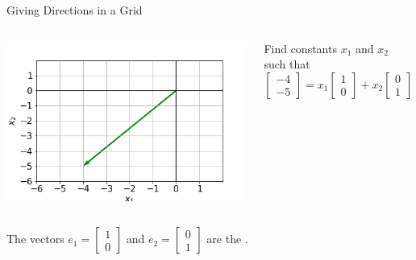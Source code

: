 \documentclass[xcoler=dvipsnames, aspectratio=169]{beamer}
\begin{document}
    \begin{frame}{Giving Directions in a Grid}
        \begin{columns}
            \includegraphics[width=.6\textwidth]{images/fig-span1.png}
            \begin{example}
                Find constants $x_1$ and $x_2$ such that
                \[
                    \begin{bmatrix}
                        -4\\-5
                    \end{bmatrix} = x_1\begin{bmatrix}
                        1\\0
                    \end{bmatrix} + x_2\begin{bmatrix}
                        0\\1
                    \end{bmatrix}
                \]
            \end{example}
        \end{columns}
        \pause
        \begin{tcolorbox}
            The vectors $e_1 = \begin{bmatrix}
                1\\0
            \end{bmatrix}$ and $e_2 = \begin{bmatrix}
                0\\1
            \end{bmatrix}$ are the .
        \end{tcolorbox}
    \end{frame}
\end{document}
